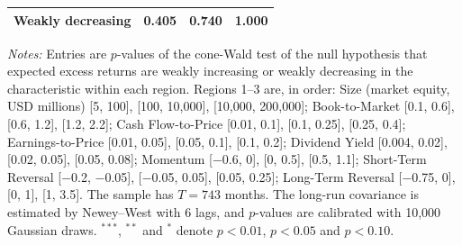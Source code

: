 \begin{table}[!htbp]
\begin{tabular}{lccc}
\quad Weakly decreasing & 0.405 & 0.740 & 1.000 \\
\bottomrule
\end{tabular}
\par\medskip
\begin{minipage}{\linewidth}
\footnotesize\textit{Notes:} Entries are $p$-values of the cone-Wald test of the null hypothesis that expected excess returns are weakly increasing or weakly decreasing in the characteristic within each region. Regions 1--3 are, in order: Size (market equity, USD millions) [5, 100], [100, 10,000], [10,000, 200,000]; Book-to-Market [0.1, 0.6], [0.6, 1.2], [1.2, 2.2]; Cash Flow-to-Price [0.01, 0.1], [0.1, 0.25], [0.25, 0.4]; Earnings-to-Price [0.01, 0.05], [0.05, 0.1], [0.1, 0.2]; Dividend Yield [0.004, 0.02], [0.02, 0.05], [0.05, 0.08]; Momentum [$-$0.6, 0], [0, 0.5], [0.5, 1.1]; Short-Term Reversal [$-$0.2, $-$0.05], [$-$0.05, 0.05], [0.05, 0.25]; Long-Term Reversal [$-$0.75, 0], [0, 1], [1, 3.5]. The sample has $T = 743$ months. The long-run covariance is estimated by Newey--West with 6 lags, and $p$-values are calibrated with 10,000 Gaussian draws. $^{***}$, $^{**}$ and $^{*}$ denote $p < 0.01$, $p < 0.05$ and $p < 0.10$.
\end{minipage}
\end{table}
